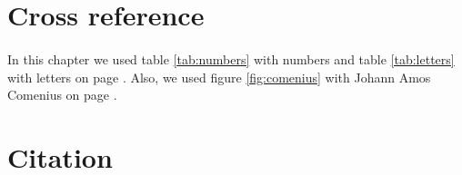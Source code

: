 \section{Cross reference}
\paragraph{}
In this chapter we used table \ref{tab:numbers} with numbers and table \ref{tab:letters} with letters on page \pageref{tab:letters}. Also, we used figure \ref{fig:comenius} with Johann Amos Comenius on page \pageref{fig:comenius}.

\section{Citation}
\cite{sqm}\cite{sqm_phd}\cite{ji_bm}
